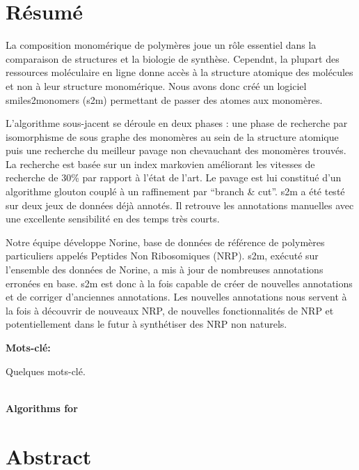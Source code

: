 \documentclass[12pt]{LHSV_thesis}
\begin{document}
\section*{\Huge Résumé}
%

La composition monomérique de polymères joue un rôle essentiel dans la comparaison de structures et la biologie de synthèse.
Cependnt, la plupart des ressources moléculaire en ligne donne accès à la structure atomique des molécules et non à leur structure monomérique.
Nous avons donc créé un logiciel smiles2monomers (s2m) permettant de passer des atomes aux monomères.

L'algorithme sous-jacent se déroule en deux phases : une phase de recherche par isomorphisme de sous graphe des monomères au sein de la structure atomique puis une recherche du meilleur pavage non chevauchant des monomères trouvés.
La recherche est basée sur un index markovien améliorant les vitesses de recherche de 30\% par rapport à l'état de l'art.
Le pavage est lui constitué d'un algorithme glouton couplé à un raffinement par ``branch \& cut''.
s2m a été testé sur deux jeux de données déjà annotés.
Il retrouve les annotations manuelles avec une excellente sensibilité en des temps très courts.

Notre équipe développe Norine, base de données de référence de polymères particuliers appelés Peptides Non Ribosomiques (NRP).
s2m, exécuté sur l'ensemble des données de Norine, a mis à jour de nombreuses annotations erronées en base.
s2m est donc à la fois capable de créer de nouvelles annotations et de corriger d'anciennes annotations.
Les nouvelles annotations nous servent à la fois à découvrir de nouveaux NRP, de nouvelles fonctionnalités de NRP et potentiellement dans le futur à synthétiser des NRP non naturels.


\vspace*{28pt}\par
\textbf{Mots-clé:}\par
Quelques mots-clé.
\par
\clearpage

\begin{center}
~\vspace{6.0cm}\\
\thispagestyle{plain}
\Huge \textbf{Algorithms for }
\vspace*{\fill}
\clearpage
\end{center}

\section*{\Huge Abstract}
%
\vspace{2cm}
\end{document}
